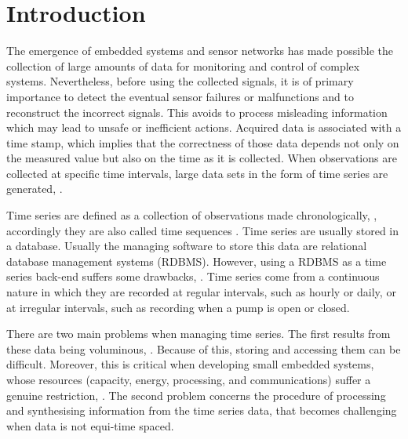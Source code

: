\section{Introduction}


The emergence of embedded systems and sensor networks has made
possible the collection of large amounts of data for monitoring and
control of complex systems.
%
Nevertheless, before using the collected signals, it is of primary
importance to detect the eventual sensor failures or malfunctions and
to reconstruct the incorrect signals. This avoids to process
misleading information which may lead to unsafe or inefficient
actions. Acquired data is associated with a time stamp, which implies
that the correctness of those data depends not only on the measured
value but also on the time as it is collected. When observations are
collected at specific time intervals, large data sets in the form of
time series are generated, \cite{basu07:_autom}.

Time series are defined as a collection of observations made
chronologically, \cite{fu11}, accordingly they are also called time
sequences \cite{last:hetland}.  Time series are usually stored in a
database. Usually the managing software to store this data are
relational database management systems (RDBMS). However, using a RDBMS
as a time series back-end suffers some drawbacks,
\cite{dreyer94,schmidt95,stonebraker09:scidb,zhang11}. Time series
come from a continuous nature in which they are recorded at regular
intervals, such as hourly or daily, or at irregular intervals, such as
recording when a pump is open or closed.

There are two main problems when managing time series. The first
results from these data being voluminous, \cite{fu11}. Because of
this, storing and accessing them can be difficult. Moreover, this is
critical when developing small embedded systems, whose resources
(capacity, energy, processing, and communications) suffer a genuine
restriction, \cite{yaogehrke02}.  The second problem concerns the
procedure of processing and synthesising information from the time
series data, that becomes challenging when data is not equi-time
spaced.



